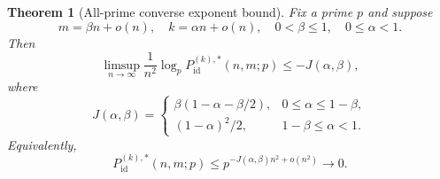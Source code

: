 \documentclass[11pt]{article}
\newcommand{\1}{\mathbf 1}
\theoremstyle{plain}
\newtheorem{theorem}{Theorem}[section]
\theoremstyle{definition}
\theoremstyle{remark}
\begin{document}
\begin{theorem}[All-prime converse exponent bound]
\label{thm:converse-common-asymptotic-reduction}
Fix a prime $p$ and suppose
\begin{equation}
 m=\beta n+o(n),\quad k=\alpha n+o(n),
 \quad 0<\beta\le1,\quad 0\le\alpha<1.
 \label{eq:direct-finite-scaling}
\end{equation}
Then
\begin{equation}
 \limsup_{n\to\infty}\frac1{n^2}
 \log_p P_{\mathrm{id}}^{(k),*}(n,m;p)
 \le -J(\alpha,\beta),
 \label{eq:direct-finite-limsup}
\end{equation}
where
\begin{equation}
 J(\alpha,\beta)=
 \begin{cases}
 \beta(1-\alpha-\beta/2),&0\le\alpha\le1-\beta,\\[1mm]
 (1-\alpha)^2/2,&1-\beta\le\alpha<1.
 \end{cases}
 \label{eq:direct-finite-J}
\end{equation}
Equivalently,
\begin{equation}
 P_{\mathrm{id}}^{(k),*}(n,m;p)
 \le p^{-J(\alpha,\beta)n^2+o(n^2)}\longrightarrow0.
 \label{eq:quadratic-converse}
\end{equation}
\end{theorem}
\end{document}
